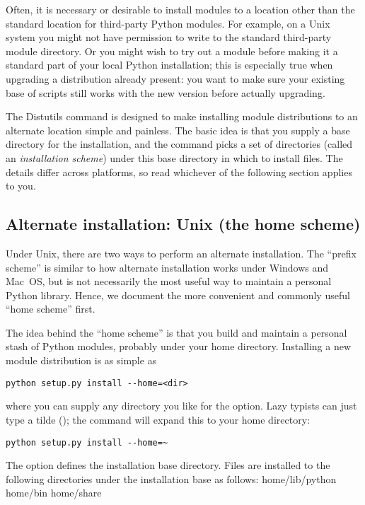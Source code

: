 \documentclass{howto}
\begin{document}
Often, it is necessary or desirable to install modules to a location
other than the standard location for third-party Python modules.  For
example, on a Unix system you might not have permission to write to the
standard third-party module directory.  Or you might wish to try out a
module before making it a standard part of your local Python
installation; this is especially true when upgrading a distribution
already present: you want to make sure your existing base of scripts
still works with the new version before actually upgrading.

The Distutils  command is designed to make installing
module distributions to an alternate location simple and painless.  The
basic idea is that you supply a base directory for the installation, and
the  command picks a set of directories (called an
\emph{installation scheme}) under this base directory in which to
install files.  The details differ across platforms, so read whichever
of the following section applies to you.


\subsection{Alternate installation: Unix (the home scheme)}
\label{alt-unix-prefix}

Under Unix, there are two ways to perform an alternate installation.
The ``prefix scheme'' is similar to how alternate installation works
under Windows and Mac~OS, but is not necessarily the most useful way to
maintain a personal Python library.  Hence, we document the more
convenient and commonly useful ``home scheme'' first.

The idea behind the ``home scheme'' is that you build and maintain a
personal stash of Python modules, probably under your home directory.
Installing a new module distribution is as simple as
\begin{verbatim}
python setup.py install --home=<dir>
\end{verbatim}
where you can supply any directory you like for the 
option.  Lazy typists can just type a tilde (\code{\textasciitilde}); the
 command will expand this to your home directory:
\begin{verbatim}
python setup.py install --home=~
\end{verbatim}

The  option defines the installation base
directory.  Files are installed to the following directories under the
installation base as follows:
              {home}{/lib/python}
              {home}{/bin}
              {home}{/share}
\end{document}
